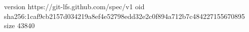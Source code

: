 version https://git-lfs.github.com/spec/v1
oid sha256:1caf9cb2157d034219a8ef4e52798edd32e2c0f894a712b7c484227155670895
size 43840
